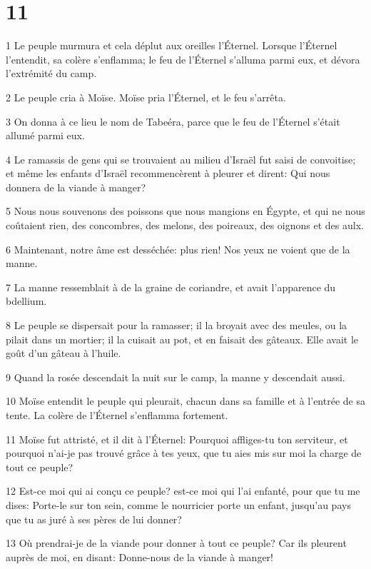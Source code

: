 \chapter{11}

\par 1 Le peuple murmura et cela déplut aux oreilles l'Éternel. Lorsque l'Éternel l'entendit, sa colère s'enflamma; le feu de l'Éternel s'alluma parmi eux, et dévora l'extrémité du camp.
\par 2 Le peuple cria à Moïse. Moïse pria l'Éternel, et le feu s'arrêta.
\par 3 On donna à ce lieu le nom de Tabeéra, parce que le feu de l'Éternel s'était allumé parmi eux.
\par 4 Le ramassis de gens qui se trouvaient au milieu d'Israël fut saisi de convoitise; et même les enfants d'Israël recommencèrent à pleurer et dirent: Qui nous donnera de la viande à manger?
\par 5 Nous nous souvenons des poissons que nous mangions en Égypte, et qui ne nous coûtaient rien, des concombres, des melons, des poireaux, des oignons et des aulx.
\par 6 Maintenant, notre âme est desséchée: plus rien! Nos yeux ne voient que de la manne.
\par 7 La manne ressemblait à de la graine de coriandre, et avait l'apparence du bdellium.
\par 8 Le peuple se dispersait pour la ramasser; il la broyait avec des meules, ou la pilait dans un mortier; il la cuisait au pot, et en faisait des gâteaux. Elle avait le goût d'un gâteau à l'huile.
\par 9 Quand la rosée descendait la nuit sur le camp, la manne y descendait aussi.
\par 10 Moïse entendit le peuple qui pleurait, chacun dans sa famille et à l'entrée de sa tente. La colère de l'Éternel s'enflamma fortement.
\par 11 Moïse fut attristé, et il dit à l'Éternel: Pourquoi affliges-tu ton serviteur, et pourquoi n'ai-je pas trouvé grâce à tes yeux, que tu aies mis sur moi la charge de tout ce peuple?
\par 12 Est-ce moi qui ai conçu ce peuple? est-ce moi qui l'ai enfanté, pour que tu me dises: Porte-le sur ton sein, comme le nourricier porte un enfant, jusqu'au pays que tu as juré à ses pères de lui donner?
\par 13 Où prendrai-je de la viande pour donner à tout ce peuple? Car ils pleurent auprès de moi, en disant: Donne-nous de la viande à manger!
